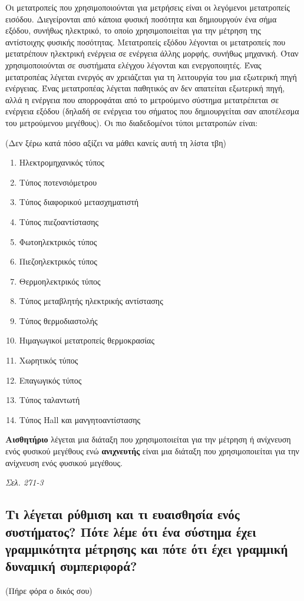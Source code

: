 \documentclass{article}
\begin{document}
Οι μετατροπείς που χρησιμοποιούνται για μετρήσεις είναι οι λεγόμενοι μετατροπείς εισόδου. Διεγείρονται από κάποια φυσική ποσότητα και δημιουργούν ένα σήμα εξόδου, συνήθως
ηλεκτρικό, το οποίο χρησιμοποιείται για την μέτρηση της αντίστοιχης φυσικής ποσότητας. Μετατροπείς εξόδου λέγονται οι μετατροπείς που μετατρέπουν ηλεκτρική ενέργεια 
σε ενέργεια άλλης μορφής, συνήθως μηχανική. Όταν χρησιμοποιούνται σε συστήματα ελέγχου λέγονται και ενεργοποιητές. Ένας μετατροπέας λέγεται ενεργός αν χρειάζεται 
για τη λειτουργία του μια εξωτερική πηγή ενέργειας. Ένας μετατροπέας λέγεται παθητικός αν δεν απατείται εξωτερική πηγή, αλλά η ενέργεια που απορροφάται από το μετρούμενο
σύστημα μετατρέπεται σε ενέργεια εξόδου (δηλαδή σε ενέργεια του σήματος που δημιουργείται σαν αποτέλεσμα του μετρούμενου μεγέθους). Οι πιο διαδεδομένοι τύποι μετατροπών 
είναι:

(Δεν ξέρω κατά πόσο αξίζει να μάθει κανείς αυτή τη λίστα τβη)

\begin{enumerate}
    \item Ηλεκτρομηχανικός τύπος 
    \item Τύπος ποτενσιόμετρου
    \item Τύπος διαφορικού μετασχηματιστή
    \item Τύπος πιεζοαντίστασης
    \item Φωτοηλεκτρικός τύπος
    \item Πιεζοηλεκτρικός τύπος 
    \item Θερμοηλεκτρικός τύπος
    \item Τύπος μεταβλητής ηλεκτρικής αντίστασης
    \item Τύπος θερμοδιαστολής
    \item Ηιμαγωγικοί μετατροπείς θερμοκρασίας
    \item Χωρητικός τύπος 
    \item Επαγωγικός τύπος
    \item Τύπος ταλαντωτή
    \item Τύπος \foreignlanguage{english}{Hall} και μανγητοαντίστασης
\end{enumerate}

\textbf{Αισθητήριο} λέγεται μια διάταξη που χρησιμοποιείται για την μέτρηση ή ανίχνευση ενός φυσικού μεγέθους ενώ \textbf{ανιχνευτής} είναι μια διάταξη που 
χρησιμοποιείται για την ανίχνευση ενός φυσικού μεγέθους.

\emph{Σελ. 271-3}
\subsection{Τι λέγεται ρύθμιση και τι ευαισθησία ενός συστήματος? Πότε λέμε ότι ένα σύστημα έχει γραμμικότητα μέτρησης και πότε ότι έχει γραμμική δυναμική συμπεριφορά?}
\scriptsize (Πήρε φόρα ο δικός σου)
\normalsize
\end{document}
